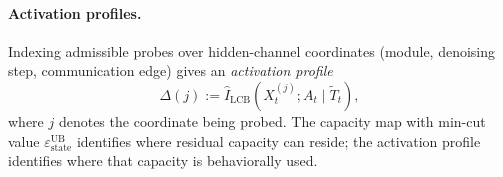   \paragraph{Activation profiles.}
  Indexing admissible probes over hidden-channel coordinates (module,
  denoising step, communication edge) gives an \emph{activation profile}
  \[
    \Delta(j)
    :=
    \widehat I_\text{LCB}(X_t^{(j)};A_t\mid\tilde T_t),
  \]
  where $j$ denotes the coordinate being probed. The capacity map with min-cut
  value $\varepsilon_\text{state}^\text{UB}$ identifies where residual capacity
  can reside; the activation profile identifies where that capacity is
  behaviorally used.
